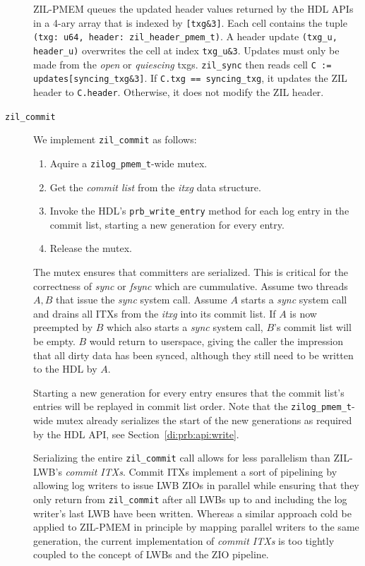 \documentclass[12pt,a4paper,twoside]{book}
\begin{document}
\begin{description}
        ZIL-PMEM queues the updated header values returned by the HDL APIs in a 4-ary array that is indexed by \lstinline{[txg&3]}.
        Each cell contains the tuple \lstinline{(txg: u64, header: zil_header_pmem_t)}.
        A header update \lstinline{(txg_u, header_u)} overwrites the cell at index \lstinline{txg_u&3}.
        Updates must only be made from the \textit{open} or \textit{quiescing} txgs.
        \lstinline{zil_sync} then reads cell \lstinline{C := updates[syncing_txg&3]}.
        If \lstinline{C.txg == syncing_txg}, it updates the ZIL header to \lstinline{C.header}.
        Otherwise, it does not modify the ZIL header.

    \item[\lstinline{zil_commit}]
        We implement \lstinline{zil_commit} as follows:
        \begin{enumerate}[noitemsep]
            \item Aquire a \lstinline{zilog_pmem_t}-wide mutex.
            \item Get the \textit{commit list} from the \textit{itxg} data structure.
            \item Invoke the HDL's \lstinline{prb_write_entry} method for each log entry in the commit list, starting a new generation for every entry.
            \item Release the mutex.
        \end{enumerate}
        The mutex ensures that committers are serialized.
        This is critical for the correctness of \textit{sync} or \textit{fsync} which are cummulative.
        Assume two threads $A, B$ that issue the \textit{sync} system call.
        Assume $A$ starts a \textit{sync} system call and drains all ITXs from the \textit{itxg} into its commit list.
        If $A$ is now preempted by $B$ which also starts a \textit{sync} system call, $B$'s commit list will be empty.
        $B$ would return to userspace, giving the caller the impression that all dirty data has been synced, although they still need to be written to the HDL by $A$.

        Starting a new generation for every entry ensures that the commit list's entries will be replayed in commit list order.
        Note that the \lstinline{zilog_pmem_t}-wide mutex already serializes the start of the new generations as required by the HDL API, see Section~\ref{di:prb:api:write}.

        Serializing the entire \lstinline{zil_commit} call allows for less parallelism than ZIL-LWB's \textit{commit ITXs}.
        Commit ITXs implement a sort of pipelining by allowing log writers to issue LWB ZIOs in parallel while ensuring that they only return from \lstinline{zil_commit} after all LWBs up to and including the log writer's last LWB have been written.
        Whereas a similar approach cold be applied to ZIL-PMEM in principle by mapping parallel writers to the same generation, the current implementation of \textit{commit ITXs} is too tightly coupled to the concept of LWBs and the ZIO pipeline.


\end{description}
\end{document}

